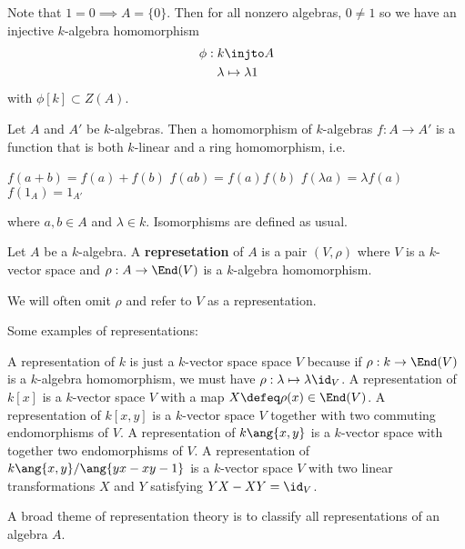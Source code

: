 \begin{rmk}
	Note that $1=0 \implies A=\{0\}$.
	Then for all nonzero algebras, $0 \neq 1$ so we have an injective $k$-algebra homomorphism
	\begin{align*}
		\phi:k&\injto A \\
		\lambda&\mapsto\lambda 1
	\end{align*}
	with $\phi[k] \subset Z(A)$.	
\end{rmk}

\begin{defn}
	Let $A$ and $A'$ be $k$-algebras.
	Then a homomorphism of $k$-algebras $f:A \to A'$ is a function that is both $k$-linear and a ring homomorphism, i.e.\@
	\begin{itm}
		\io $f(a+b)=f(a)+f(b)$
		\io $f(ab)=f(a)f(b)$
		\io $f(\lambda a)=\lambda f(a)$
		\io $f(1_A)=1_{A'}$
	\end{itm}
	where $a,b \in A$ and $\lambda \in k$.
	Isomorphisms are defined as usual.
\end{defn}

\begin{defn}
	Let $A$ be a $k$-algebra.
	A \textbf{represetation} of $A$ is a pair $(V,\rho)$ where $V$ is a $k$-vector space and $\rho:A \to \End(V)$ is a $k$-algebra homomorphism.
\end{defn}

\begin{rmk}
	We will often omit $\rho$ and refer to $V$ as a representation.
\end{rmk}

\begin{exam}
	Some examples of representations:
	\begin{enum}
		\io A representation of $k$ is just a $k$-vector space space $V$ because if $\rho:k\to \End(V)$ is a $k$-algebra homomorphism, we must have $\rho:\lambda\mapsto \lambda\id_V$.
		\io A representation of $k[x]$ is a $k$-vector space $V$ with a map $X\defeq\rho(x)\in\End(V)$.
		\io A representation of $k[x,y]$ is a $k$-vector space $V$ together with two commuting endomorphisms of $V$.
		\io A representation of $k\ang{x,y}$ is a $k$-vector space with together two endomorphisms of $V$.
		\io A representation of $k\ang{x,y}/\ang{yx-xy-1}$ is a $k$-vector space $V$ with two linear transformations $X$ and $Y$ satisfying $YX-XY=\id_V$.
	\end{enum}
\end{exam}

A broad theme of representation theory is to classify all representations of an algebra $A$.